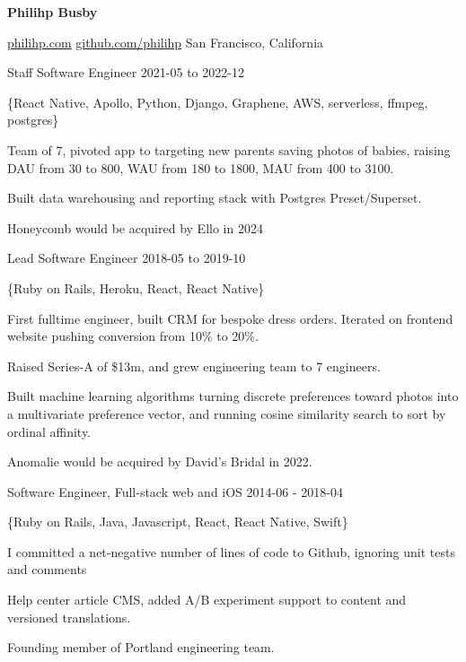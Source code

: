 \documentclass[11pt,english]{article}
\begin{document}
\centerline{{\Huge \bf Philihp Busby}}
\bigskip

        {\href{https://philihp.com}{philihp.com}}
        {\href{https://github.com/philihp}{github.com/philihp}}
        {San Francisco, California}


\begin{description}
\squish

           {Staff Software Engineer}
           {2021-05 to 2022-12}

\{React Native, Apollo, Python, Django, Graphene, AWS, serverless, ffmpeg, postgres\}
           
Team of 7, pivoted app to targeting new parents saving photos of babies, raising DAU from 30 to 800, WAU from 180 to 1800, MAU from 400 to 3100. 

Built data warehousing and reporting stack with Postgres Preset/Superset.

Honeycomb would be acquired by Ello in 2024

           {Lead Software Engineer}
           {2018-05 to 2019-10}

\{Ruby on Rails, Heroku, React, React Native\}
           
First fulltime engineer, built CRM for bespoke dress orders. Iterated on frontend website pushing conversion from 10\% to 20\%.

Raised Series-A of \$13m, and grew engineering team to 7 engineers.

Built machine learning algorithms turning discrete preferences toward photos into a multivariate preference vector, and running cosine similarity search to sort by ordinal affinity.

Anomalie would be acquired by David's Bridal in 2022.

           {Software Engineer, Full-stack web and iOS}
           {2014-06 - 2018-04}

\{Ruby on Rails, Java, Javascript, React, React Native, Swift\}

I committed a net-negative number of lines of code to Github, ignoring unit tests and comments

Help center article CMS, added A/B experiment support to content and versioned translations.

Founding member of Portland engineering team.


\end{description}
\end{document}
